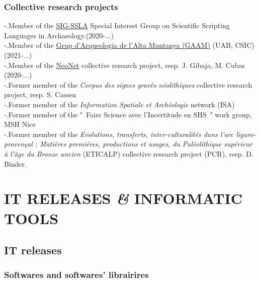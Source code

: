 \documentclass{article}
\begin{document}
\subsubsection*{Collective research projects}

-.Member of the \href{https://sslarch.github.io/}{SIG-SSLA} Special Interest Group on Scientific Scripting Languages in Archaeology.(2020-...)\\ 
-.Member of the \href{https://arqueologiademuntanya.wordpress.com/}{Grup d'Arqueologia de l'Alta Muntanya (GAAM)} (UAB, CSIC) (2021-...)\\ 
-.Member of the \href{https://redneonet.com/}{NeoNet} collective research project, resp. J. Gibaja, M. Cubas (2020-...)\\ 
-.Former member of the \textit{Corpus des signes grav\'{e}s n\'{e}olithiques} collective research project, resp. S. Cassen\\
-.Former member of the \textit{Information Spatiale et Arch\'{e}ologie} network (ISA)\\ 
-.Former member of the "~Faire Science avec l'Incertitude en SHS~" work group, MSH Nice\\ 
-.Former member of the \textit{Evolutions, transferts, inter-culturalit\'{e}s dans l'arc liguro-proven\c{c}al : Mati\'{e}res premi\'{e}res, productions et usages, du Pal\'{e}olithique sup\'{e}rieur \`{a} l'\^{a}ge du Bronze ancien} (ETICALP) collective research project (PCR), resp. D. Binder.


\section{IT RELEASES \textit{\&} INFORMATIC TOOLS}

\subsection*{IT releases}

\subsubsection*{Softwares and softwares' librairires}
\end{document}

